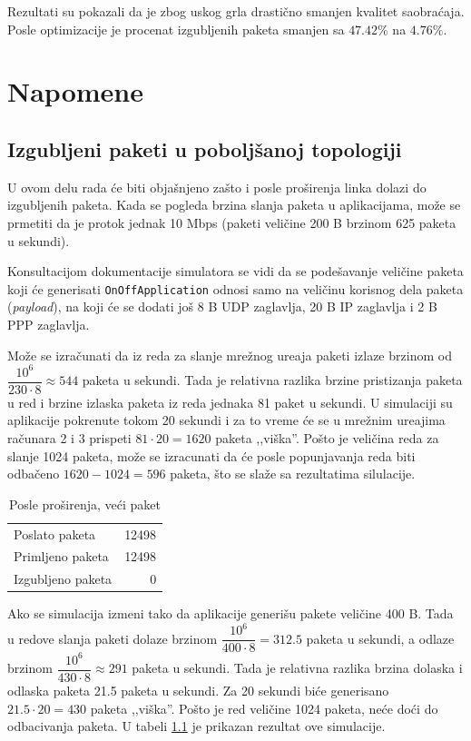 \documentclass[a4paper, 12pt, projekat]{etf}
\begin{document}
	Rezultati su pokazali da je zbog uskog grla drastično smanjen kvalitet saobraćaja. Posle optimizacije je procenat izgubljenih paketa smanjen sa $47.42\%$ na $4.76\%$.
	
	\chapter{Napomene}
	\section{Izgubljeni paketi u pobolj\v{s}anoj topologiji}
	U ovom delu rada \'{c}e biti obja\v{s}njeno  za\v{s}to i posle pro\v{s}irenja linka dolazi do izgubljenih paketa. Kada se pogleda brzina slanja paketa u aplikacijama, mo\v{z}e se prmetiti da je protok jednak 10\! Mbps (paketi veli\v{c}ine 200\! B brzinom 625 paketa u sekundi).
	
	Konsultacijom dokumentacije simulatora se vidi da se pode\v{s}avanje veli\v{c}ine paketa koji \'{c}e generisati \texttt{OnOffApplication} odnosi samo na veli\v{c}inu korisnog dela paketa (\emph{payload}), na koji \'{c}e se dodati jo\v{s} 8\! B UDP zaglavlja, 20\! B IP zaglavlja i 2\! B PPP zaglavlja. 
	
	Mo\v{z}e se izra\v{c}unati da iz reda za slanje mre\v{z}nog ure\dj{}aja paketi izlaze brzinom od $\dfrac{10^{6}}{230 \cdot 8} \approx 544$ paketa u sekundi. Tada je relativna razlika brzine pristizanja paketa u red i brzine izlaska paketa iz reda jednaka 81 paket u sekundi. U simulaciji su aplikacije pokrenute tokom 20 sekundi i za to vreme \'{c}e se u mre\v{z}nim ure\dj{}ajima ra\v{c}unara 2 i 3 prispeti $81 \cdot 20 = 1620$ paketa ,,vi\v{s}ka''. Po\v{s}to je veli\v{c}ina reda za slanje 1024 paketa, mo\v{z}e se izracunati da \'{c}e posle popunjavanja reda biti odba\v{c}eno $1620 - 1024 = 596$ paketa, \v{s}to se sla\v{z}e sa rezultatima silulacije.
	
	
	\begin{table}[htb]
		\centering
		\caption{Posle pro\v{s}irenja, ve\'c{i} paket}
		\label{tab:vecipaket}
		\medskip
		\begin{tabular}{l|r}
			\hline
			Poslato paketa & 12498 \\
			Primljeno paketa & 12498 \\
			Izgubljeno paketa & 0 
		\end{tabular}
	\end{table}
	
	
	Ako se simulacija izmeni tako da aplikacije generi\v{s}u pakete veli\v{c}ine 400\! B. Tada u redove slanja paketi dolaze brzinom $\dfrac{10^{6}}{400 \cdot 8} = 312.5$ paketa u sekundi, a odlaze brzinom $\dfrac{10^{6}}{430 \cdot 8} \approx 291$ paketa u sekundi. Tada je relativna razlika brzina dolaska i odlaska paketa 21.5 paketa u sekundi. Za 20 sekundi bi\'{c}e generisano $21.5 \cdot 20 = 430$ paketa ,,vi\v{s}ka''. Po\v{s}to je red veli\v{c}ine 1024 paketa, ne\'{c}e do\'{c}i do odbacivanja paketa. U tabeli \ref{tab:vecipaket} je prikazan rezultat ove simulacije.
	
\end{document}
